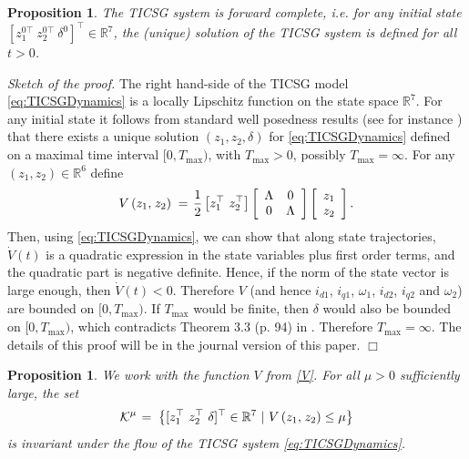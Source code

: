\documentclass{ifacconf}
\newtheorem{proposition}[theorem]{Proposition}
\newcommand{\BE}{\begin{equation}}
\newcommand{\BEQ}[1]{\BE\label{#1}} %
\newcommand{\rline}  {{\mathbb R}}
\renewcommand{\L}    {{\Lambda}}
\renewcommand{\o}    {{\omega}}
\renewcommand{\half} {{\frac{1}{2}}}
\newcommand{\m}      {{\hbox{\hskip 1pt}}}
\newcommand{\Kmscr}  {{\mathcal{K}}}
\begin{document}
\begin{proposition} \label{forwardComplete}
The TICSG system is forward complete, i.e. for any initial state
$\left[ z_1^{0\top} \ z_2^{0\top} \ \delta^{0} \right]^\top \in
\mathbb{R}^7 $, the (unique) solution of the TICSG system is defined
for all $t>0$.
\end{proposition}

{\em Sketch of the proof.} \m The right hand-side of the TICSG model 
\eqref{eq:TICSGDynamics} is a locally Lipschitz function on the state
space $\rline^7$. For any initial state it follows from standard well
posedness results (see for instance \cite[Ch.~3]{Khalil}) that there
exists a unique solution $(z_1,z_2,\delta)$ for
\eqref{eq:TICSGDynamics} defined on a maximal time interval
$[0,{T_{\max}})$, with ${T_{\max}}>0$, possibly $T_{\max}=\infty$.
For any $(z_1,z_2)\in\rline^6$ define \vspace{-1mm} 
\BEQ{V} 
   V\left(z_1,\m z_2\right)
   \m=\m \half \left[z_1^\top\ z_2^\top \right]\left[ \begin{array}
   {cc} \L & 0\\ 0 & \L\end{array} \right]\left[ \begin{array}{c}
   z_1\\ z_2\end{array}\right].
\end{equation}
Then, using \eqref{eq:TICSGDynamics}, we can show that along state
trajectories, $\dot{V}(t)$ is a quadratic expression in the state
variables plus first order terms, and the quadratic part is negative
definite. Hence, if the norm of the state vector is large enough, then
$\dot{V}(t)<0$. Therefore $V$ (and hence $i_{d1}$, $i_{q1}$, $\o_1$,
$i_{d2}$, $i_{q2}$ and $\o_2$) are bounded on $[0,{T_{\max}})$. If
$T_{\max}$ would be finite, then $\delta$ would also be bounded on
$[0,{T_{\max}})$, which contradicts Theorem 3.3 (p. 94) in
\cite{Khalil}. Therefore $T_{\max}=\infty$.  The details of this proof
will be in the journal version of this paper. \m $\Box$

\medskip
\begin{proposition} \label{Superland}
We work with the function $V$ from \eqref{V}. For all $\mu>0$ 
sufficiently large, the set
$$ \Kmscr^\mu \m=\m \left\{ [z_1^\top\ z_2^\top\ \delta]^\top\in
   \rline^7\ |\ V\left(z_1,\m z_2\right)\leq\mu \right\}$$
is invariant under the flow of the TICSG system 
\eqref{eq:TICSGDynamics}.
\end{proposition}
\end{document}
